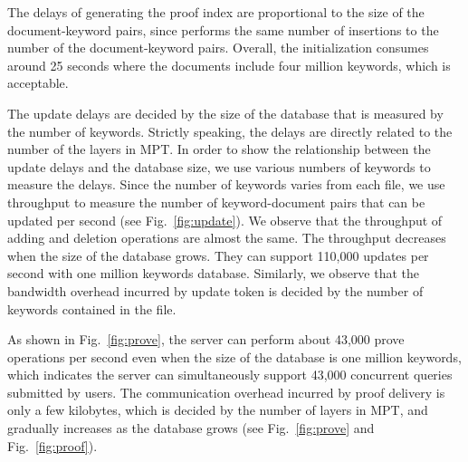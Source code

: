 The delays of generating the proof index are proportional to the size of the document-keyword pairs, since \name performs the same number of insertions to the number of the document-keyword pairs. Overall, the initialization consumes around 25 seconds where the documents include four million keywords, which is acceptable.

The update delays are decided by the size of the database that is measured by the number of keywords.
Strictly speaking, the delays are directly related to the number of the layers in MPT. In order to show the relationship between the update delays and the database size, we use various numbers of keywords to measure the delays. Since the number of keywords varies from each file, we use throughput to measure the number of keyword-document pairs that can be updated per second (see Fig.~\ref{fig:update}). We observe that the throughput of adding and deletion operations are almost the same. The throughput decreases when the size of the database grows. They can support 110,000 updates per second with one million keywords database.
Similarly, we observe that the bandwidth overhead incurred by update token is decided by the number of keywords contained in the file. 

As shown in Fig.~\ref{fig:prove}, the server can perform about 43,000 prove operations per second even when the size of the database is one million keywords, which indicates the server can simultaneously support 43,000 concurrent queries submitted by users. 
The communication overhead incurred by proof delivery is only a few kilobytes, which is decided by the number of layers in MPT, and gradually increases as the database grows (see Fig.~\ref{fig:prove} and Fig.~\ref{fig:proof}).

